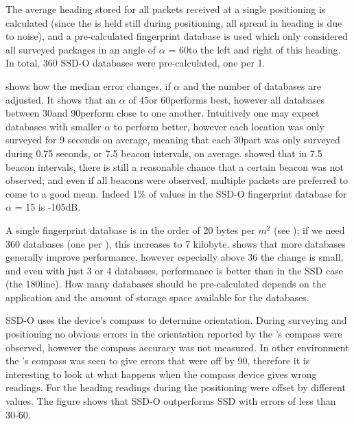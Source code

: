 The average heading stored for all packets received at a single positioning is calculated (since the \device is held still during positioning, all spread in heading is due to noise), and a pre-calculated fingerprint database is used which only considered all surveyed packages in an angle of $\alpha$ = 60\tdegree to the left and right of this heading.
In total, 360 SSD-O databases were pre-calculated, one per 1\tdegree.

 shows how the median error changes, if $\alpha$ and the number of databases are adjusted.
It shows that an $\alpha$ of 45\tdegree or 60\tdegree performs best, however all databases between 30\tdegree and 90\tdegree perform close to one another.
Intuitively one may expect databases with smaller $\alpha$ to perform better, however each location was only surveyed for 9 seconds on average, meaning that each 30\tdegree part was only surveyed during 0.75 seconds, or 7.5 beacon intervals, on average.
 showed that in 7.5 beacon intervals, there is still a reasonable chance that a certain beacon was not observed; and even if all beacons were observed, multiple packets are preferred to come to a good mean.
Indeed 1\% of values in the SSD-O fingerprint database for $\alpha$ = 15 is -105dB.

A single fingerprint database is in the order of 20 bytes per $m^2$ (see ); if we need 360 databases (one per \tdegree), this increases to 7 kilobyte.
 shows that more databases generally improve performance, however especially above 36 the change is small, and even with just 3 or 4 databases, performance is better than in the SSD case (the 180\tdegree line).
How many databases should be pre-calculated depends on the application and the amount of storage space available for the databases.

SSD-O uses the device's compass to determine orientation.
During surveying and positioning no obvious errors in the orientation reported by the \device's compass were observed, however the compass accuracy was not measured.
In other environment the \device's compass was seen to give errors that were off by 90\tdegree, therefore it is interesting to look at what happens when the compass device gives wrong readings.
For  the heading readings during the positioning were offset by different values.
The figure shows that SSD-O outperforms SSD with errors of less than 30-60\tdegree.

